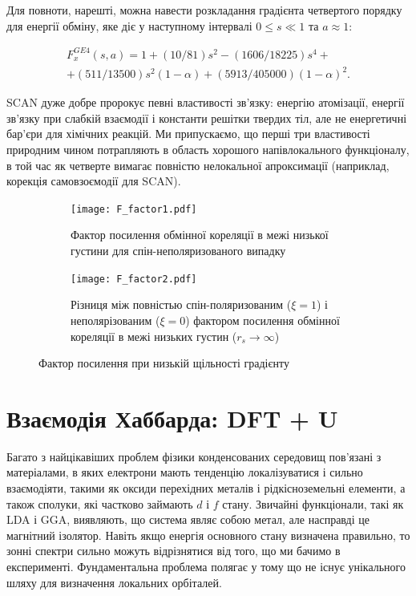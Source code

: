 Для повноти, нарешті, можна навести розкладання градієнта четвертого порядку для енергії обміну, яке діє у наступному інтервалі $0 \leq s \ll 1$ та $a \approx 1:$

\begin{eqnarray}
	F_x^{GE4}(s,a) = 1+(10/81)s^2 - (1606/18225)s^4 +\nonumber \\
 + (511/13500)s^2(1-\alpha) + (5913/405000)(1-\alpha)^2.      
\end{eqnarray}

SCAN дуже добре пророкує певні властивості зв'язку: енергію атомізації, енергії зв'язку при слабкій взаємодії і константи решітки твердих тіл, але не енергетичні бар'єри для хімічних реакцій. Ми припускаємо, що перші три властивості природним чином потрапляють в область хорошого напівлокального функціоналу, в той час як четверте вимагає повністю нелокальної апроксимації (наприклад, корекція самовзоємодії для SCAN).
 
\begin{figure}[H]
\centering
\label{fig:F_factor}
	\begin{subfigure}{.9\textwidth}
		\hspace*{-1.2cm}
    	\texttt{[image: F\_factor1.pdf]}
    	\caption{Фактор посилення обмінної кореляції в межі низької густини для спін-неполяризованого випадку}
    	\label{fig:sub1}	
	\end{subfigure}
	
	\begin{subfigure}{.9\textwidth}
		\hspace*{0.15cm}
    	\texttt{[image: F\_factor2.pdf]}
    	\caption{
    	Різниця між повністью спін-поляризованим ($\xi = 1$) і неполярізованим ($\xi = 0$) фактором посилення обмінної кореляції в межі низьких густин ($r_s \rightarrow \infty$)}
    	\label{fig:sub1}	
	\end{subfigure}
\caption{Фактор посилення при низькій щільності градієнту}
\end{figure}

\section{Взаємодія Хаббарда: DFT + U}
Багато з найцікавіших проблем фізики конденсованих середовищ пов'язані з матеріалами, в яких електрони мають тенденцію локалізуватися і сильно взаємодіяти, такими як оксиди перехідних металів і рідкісноземельні елементи, а також сполуки, які частково займають $d$ і $f$ стану. Звичайні функціонали, такі як LDA і GGA, виявляють, що система являє собою метал, але насправді це магнітний ізолятор. Навіть якщо енергія основного стану визначена правильно, то зонні спектри сильно можуть відрізнятися від того, що ми бачимо в експерименті. Фундаментальна проблема полягає у тому що не існує унікального шляху для визначення локальних орбіталей. 

